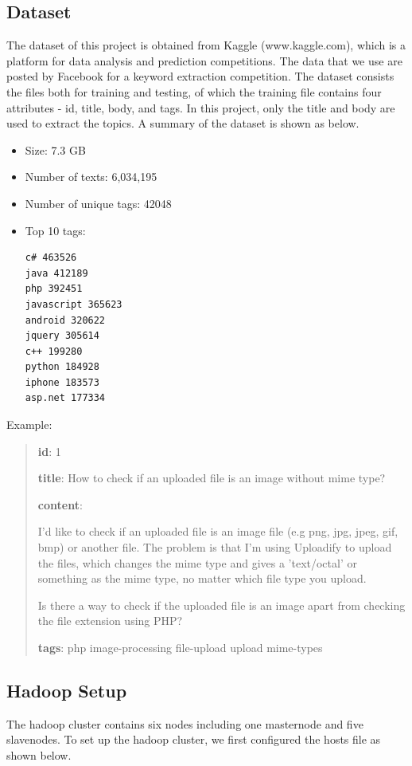 \documentclass[conference]{IEEEtran}
\begin{document}
\subsection{Dataset}
The dataset of this project is obtained from Kaggle (www.kaggle.com), which is a platform for data analysis and prediction competitions. The data that we use are posted by Facebook for a keyword extraction competition. The dataset consists the files both for training and testing, of which the training file contains four attributes - id, title, body, and tags. In this project, only the title and body are used to extract the topics. A summary of the dataset is shown as below.
\begin{itemize}
\item Size: 7.3 GB
\item Number of texts: 6,034,195
\item Number of unique tags: 42048
\item Top 10 tags:\\
\begin{verbatim}
c# 463526
java 412189
php 392451
javascript 365623
android 320622
jquery 305614
c++ 199280
python 184928
iphone 183573
asp.net 177334
\end{verbatim}
\end{itemize}
Example:
\begin{quote}

\textbf{id}: 1

\textbf{title}: How to check if an uploaded file is an image without mime type?

\textbf{content}:

I'd like to check if an uploaded file is an image file (e.g png, jpg,  jpeg, gif, bmp) or another file. The problem is that I'm using Uploadify  to upload the files, which changes the mime type and gives a 'text/octal'  or something as the mime type, no matter which file type you upload.


Is there a way to check if the uploaded file is an image apart from checking the file extension using PHP?

\textbf{tags}: php image-processing file-upload upload mime-types
\end{quote}

\subsection{Hadoop Setup}

The hadoop cluster contains six nodes including one masternode and five slavenodes. To set up the hadoop cluster, we first configured the hosts file as shown below.
\end{document}

